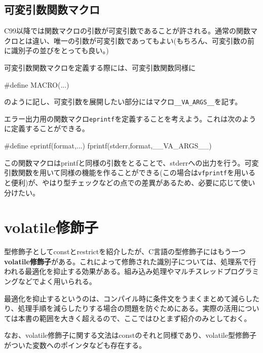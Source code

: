 \subsection{可変引数関数マクロ}
C99以降では関数マクロの引数が可変引数であることが許される。通常の関数マクロとは違い、唯一の引数が可変引数であってもよい(もちろん、可変引数の前に識別子の並びをとっても良い。)

可変引数関数マクロを定義する際には、可変引数関数同様に
\begin{code}
#define MACRO(...)
\end{code}
のように記し、可変引数を展開したい部分にはマクロ\verb|__VA_ARGS__|を記す。

エラー出力用の関数マクロ\verb|eprintf|を定義することを考えよう。これは次のように定義することができる。
\begin{code}
#define eprintf(format,...) fprintf(stderr,format,__VA_ARGS__)
\end{code}
この関数マクロはprintfと同様の引数をとることで、stderrへの出力を行う。可変引数関数を用いて同様の機能を作ることができる(この場合は\verb|vfprintf|を用いると便利)が、やはり型チェックなどの点での差異があるため、必要に応じて使い分けたい。

\section{volatile修飾子}
型修飾子としてconstとrestrictを紹介したが、C言語の型修飾子にはもう一つ\textbf{volatile修飾子}がある。これによって修飾された識別子については、処理系で行われる最適化を抑止する効果がある。組み込み処理やマルチスレッドプログラミングなどでよく用いられる。

最適化を抑止するというのは、コンパイル時に条件文をうまくまとめて減らしたり、処理手順を減らしたりする場合の問題を防ぐためにある。実際の活用については本書の範囲を大きく超えるので、ここではひとまず紹介のみとしておく。

なお、volatile修飾子に関する文法はconstのそれと同様であり、volatile型修飾子がついた変数へのポインタなども存在する。

